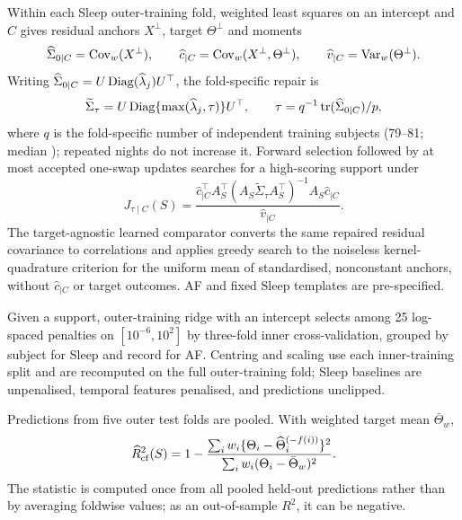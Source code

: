 Within each Sleep outer-training fold, weighted least squares on an intercept
and $C$ gives residual anchors $X^\perp$, target $\Theta^\perp$ and moments
\begin{equation}
\widehat\Sigma_{0\mid C}=\operatorname{Cov}_w(X^\perp),\qquad
\widehat c_{\mid C}=\operatorname{Cov}_w(X^\perp,\Theta^\perp),\qquad
\widehat v_{\mid C}=\operatorname{Var}_w(\Theta^\perp).
\label{eq:real-moments}
\end{equation}
Writing $\widehat\Sigma_{0\mid C}=U\operatorname{Diag}(\widehat\lambda_j)U^\top$, the
fold-specific repair is
\begin{equation}
\widetilde\Sigma_\tau
=U\operatorname{Diag}\{\max(\widehat\lambda_j,\tau)\}U^\top,
\qquad \tau=q^{-1}\operatorname{tr}(\widehat\Sigma_{0\mid C})/p,
\label{eq:real-floor}
\end{equation}
where $q$ is the fold-specific number of independent training subjects (79--81;
median \numTabTrainSubjects); repeated nights do not increase it. Forward
selection followed by at most \numSwapRounds{} accepted one-swap updates
searches for a high-scoring support under
\begin{equation}
J_{\tau\mid C}(S)=
\frac{\widehat c_{\mid C}^\top A_S^\top
(A_S\widetilde\Sigma_\tau A_S^\top)^{-1}A_S\widehat c_{\mid C}}
{\widehat v_{\mid C}}.
\label{eq:real-objective}
\end{equation}
The target-agnostic learned comparator converts the same repaired residual
covariance to correlations and applies greedy search to the noiseless
kernel-quadrature criterion
for the uniform mean of standardised, nonconstant anchors, without
$\widehat c_{\mid C}$ or target outcomes. AF and fixed Sleep templates are
pre-specified.

Given a support, outer-training ridge with an intercept selects among 25
log-spaced penalties on $[10^{-6},10^2]$ by three-fold inner cross-validation,
grouped by subject for Sleep and record for AF. Centring and scaling use each
inner-training split and are recomputed on the full outer-training fold; Sleep
baselines are unpenalised, temporal features penalised, and predictions
unclipped.

Predictions from five outer test folds are pooled. With weighted target mean
$\bar\Theta_w$,
\begin{equation}
\widehat R^2_{\rm cf}(S)=1-
\frac{\sum_iw_i\{\Theta_i-\widehat\Theta_i^{(-f(i))}\}^2}
{\sum_iw_i(\Theta_i-\bar\Theta_w)^2}.
\label{eq:weighted-cf-r2}
\end{equation}
The statistic is computed once from all pooled held-out predictions rather than
by averaging foldwise values; as an out-of-sample $R^2$, it can be negative.

